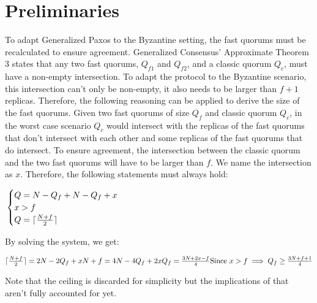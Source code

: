 \section{Preliminaries}

To adapt Generalized Paxos to the Byzantine setting, the fast quorums must be recalculated to ensure agreement. Generalized Consensus' Approximate Theorem 3 states that any two fast quorums, $Q_{f1}$ and $Q_{f2}$, and a classic quorum $Q_c$, must have a non-empty intersection. To adapt the protocol to the Byzantine scenario, this intersection can't only be non-empty, it also needs to be larger than $f+1$ replicas. Therefore, the following reasoning can be applied to derive the size of the fast quorums. Given two fast quorums of size $Q_f$ and classic quorum $Q_c$, in the worst case scenario $Q_c$ would intersect with the replicas of the fast quorums that don't intersect with each other and some replicas of the fast quorums that do intersect. To ensure agreement, the intersection between the classic quorum and the two fast quorums will have to be larger than $f$. We name the intersection as $x$. Therefore, the following statements must always hold:

$\\ \begin{cases}
		Q = N - Q_f + N-Q_f + x \\
		x > f \\
		Q = \lceil \frac{N+f}{2}\rceil
\end{cases} \\$

By solving the system, we get:

$\lceil\frac{N+f}{2}\rceil = 2N - 2Q_f + x \\
N+f = 4N - 4Q_f + 2x \\
Q_f = \frac{3N+2x-f}{4} \\ 
\text{Since $x > f$} \implies Q_f \geq \frac{3N+f+1}{4} \\$


\par
Note that the ceiling is discarded for simplicity but the implications of that aren't fully accounted for yet.
